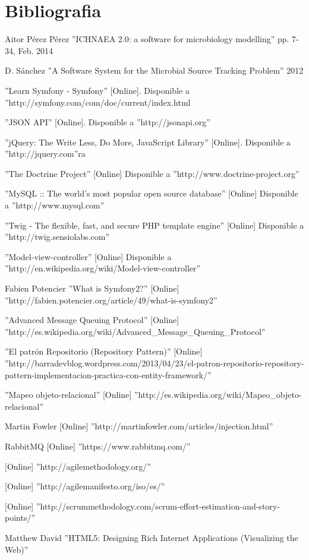 \chapter{Bibliografia}
\label{cha:bibliografia}
\begin{thebibliography}{100}
Aitor P\'{e}rez P\'{e}rez ''ICHNAEA 2.0: a software for microbiology modelling'' pp. 7-34, Feb. 2014

D. S\'{a}nchez ''A Software System for the Microbial Source Tracking Problem'' 2012

 ''Learn Symfony - Symfony'' [Online]. Disponible a ''http://symfony.com/com/doc/current/index.html

 ''JSON API''  [Online]. Disponible a ''http://jsonapi.org''

 ''jQuery: The Write Less, Do More, JavaScript Library'' [Online]. Disponible a ''http://jquery.com''ra

 ''The Doctrine Project'' [Online] Disponible a ''http://www.doctrine-project.org''

 ''MySQL :: The world's most popular open source database'' [Online] Disponible a ''http://www.mysql.com''

 ''Twig - The flexible, fast, and secure PHP template engine''  [Online] Disponible a ''http://twig.sensiolabs.com''

 ''Model-view-controller'' [Online] Disponible a ''http://en.wikipedia.org/wiki/Model-view-controller''

 Fabien Potencier ''What is Symfony2?'' [Online] ''http://fabien.potencier.org/article/49/what-is-symfony2''

 ''Advanced Message Queuing Protocol'' [Online] ''http://es.wikipedia.org/wiki/Advanced\_Message\_Queuing\_Protocol''

 ''El patr\'{o}n Repositorio (Repository Pattern)'' [Online] ''http://barradevblog.wordpress.com/2013/04/23/el-patron-repositorio-repository-pattern-implementacion-practica-con-entity-framework/''

 ''Mapeo objeto-relacional'' [Online] ''http://es.wikipedia.org/wiki/Mapeo_objeto-relacional''

 Martin Fowler [Online] ''http://martinfowler.com/articles/injection.html''

 RabbitMQ [Online] ''https://www.rabbitmq.com/''

 [Online] ''http://agilemethodology.org/''

 [Online] ''http://agilemanifesto.org/iso/es/''

 [Online] ''http://scrummethodology.com/scrum-effort-estimation-and-story-points/''

 Matthew David ''HTML5: Designing Rich Internet Applications (Visualizing the Web)''
\end{thebibliography}
